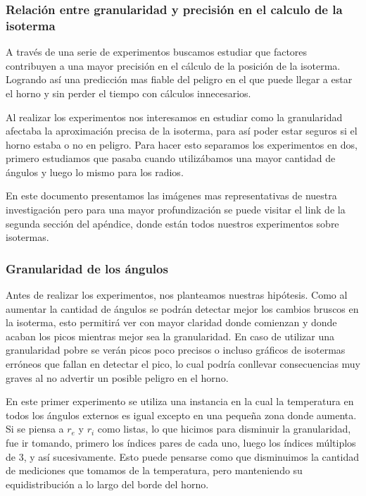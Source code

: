 \subsubsection{Relación entre granularidad y precisión en el calculo de la isoterma}
A través de una serie de experimentos buscamos estudiar que factores contribuyen a una mayor precisión en el cálculo de la posición de la isoterma. Logrando así una predicción mas fiable del peligro en el que puede llegar a estar el horno y sin perder el tiempo con cálculos innecesarios.


Al realizar los experimentos nos interesamos en estudiar como la granularidad afectaba la aproximación precisa de la isoterma, para así poder estar seguros si el horno estaba o no en peligro. Para hacer esto separamos los experimentos en dos, primero estudiamos que pasaba cuando utilizábamos una mayor cantidad de ángulos y luego lo mismo para los radios.

En este documento presentamos las imágenes mas representativas de nuestra investigación pero para una mayor profundización se puede visitar el link de la segunda sección del apéndice, donde están todos nuestros experimentos sobre isotermas.


\subsubsection{Granularidad de los ángulos}

Antes de realizar los experimentos, nos planteamos nuestras hipótesis. Como al aumentar la cantidad de ángulos se podrán detectar mejor los cambios bruscos en la isoterma, esto permitirá ver con mayor claridad donde comienzan y donde acaban los picos mientras mejor sea la granularidad. En caso de utilizar una granularidad pobre se verán picos poco precisos o incluso gráficos de isotermas erróneos que fallan en detectar el pico, lo cual podría conllevar consecuencias muy graves al no advertir un posible peligro en el horno.

En este primer experimento se utiliza una instancia en la cual la temperatura en todos los ángulos externos es igual excepto en una pequeña zona donde aumenta. Si se piensa a $r_e$ y $r_i$ como listas, lo que hicimos para disminuir la granularidad, fue ir tomando, primero los índices pares de cada uno, luego los índices múltiplos de 3, y así sucesivamente. Esto puede pensarse como que disminuimos la cantidad de mediciones que tomamos de la temperatura, pero manteniendo su equidistribución a lo largo del borde del horno.


